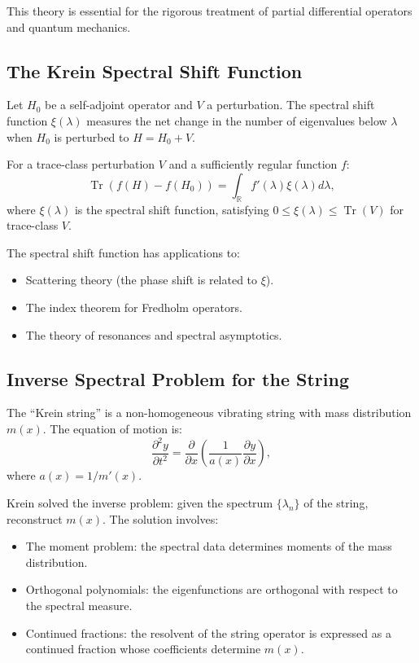 This theory is essential for the rigorous treatment of partial differential operators and quantum mechanics.

\subsection{The Krein Spectral Shift Function}

Let $H_0$ be a self-adjoint operator and $V$ a perturbation. The spectral shift function $\xi(\lambda)$ measures the net change in the number of eigenvalues below $\lambda$ when $H_0$ is perturbed to $H = H_0 + V$.

\begin{theorem}
For a trace-class perturbation $V$ and a sufficiently regular function $f$:
\[
\operatorname{Tr}(f(H) - f(H_0)) = \int_{\mathbb{R}} f'(\lambda) \xi(\lambda) d\lambda,
\]
where $\xi(\lambda)$ is the spectral shift function, satisfying $0 \leq \xi(\lambda) \leq \operatorname{Tr}(V)$ for trace-class $V$.
\end{theorem}

The spectral shift function has applications to:
\begin{itemize}
    \item Scattering theory (the phase shift is related to $\xi$).
    \item The index theorem for Fredholm operators.
    \item The theory of resonances and spectral asymptotics.
\end{itemize}

\subsection{Inverse Spectral Problem for the String}

The ``Krein string'' is a non-homogeneous vibrating string with mass distribution $m(x)$. The equation of motion is:
\[
\frac{\partial^2 y}{\partial t^2} = \frac{\partial}{\partial x} \left( \frac{1}{a(x)} \frac{\partial y}{\partial x} \right),
\]
where $a(x) = 1/m'(x)$.

Krein solved the inverse problem: given the spectrum $\{\lambda_n\}$ of the string, reconstruct $m(x)$. The solution involves:
\begin{itemize}
    \item The moment problem: the spectral data determines moments of the mass distribution.
    \item Orthogonal polynomials: the eigenfunctions are orthogonal with respect to the spectral measure.
    \item Continued fractions: the resolvent of the string operator is expressed as a continued fraction whose coefficients determine $m(x)$.
\end{itemize}

